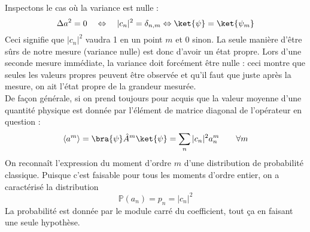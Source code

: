  Inspectons le cas où la variance est nulle :
 \begin{equation}
 \Delta a^2 = 0\quad \Leftrightarrow\quad |c_n|^2 = \delta_{n,m} \Leftrightarrow
 \ket{\psi} = \ket{\psi_m}
 \end{equation}
 Ceci signifie que $|c_n|^2$ vaudra 1 en un point $m$ et 0 sinon.
 La seule manière d'être sûrs de notre mesure (variance nulle) est donc 
 d'avoir un état propre.
 Lors d'une seconde mesure immédiate, la variance doit forcément être nulle : ceci montre que seules 
 les valeurs propres peuvent être observée et qu'il faut que juste après la 
 mesure, on ait l'état propre de la grandeur mesurée.\\
 
 De façon générale, si on prend toujours pour acquis que la valeur moyenne 
 d'une quantité physique est donnée par l'élément de matrice diagonal 
 de l'opérateur en question :
 \begin{equation}
 \langle a^m\rangle = \bra{\psi}\hat{A}^m\ket{\psi} = \sum_n |c_n|^2 a_n^m\qquad
  \forall m
 \end{equation}
 On reconnaît l'expression du moment d'ordre $m$ d'une distribution de probabilité 
 classique. 
 Puisque c'est faisable pour tous les moments d'ordre entier, on a caractérisé la distribution
 \begin{equation}
 \mathbb{P}(a_n) = p_n = |c_n|^2
 \end{equation}
 La probabilité est donnée par le module carré du coefficient, tout ça 
 en faisant une seule hypothèse.
  
